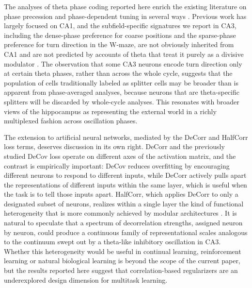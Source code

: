 \documentclass[11pt]{article}
\begin{document}
The analyses of theta phase coding reported here enrich the existing
literature on phase precession and phase-dependent tuning in several ways
\cite{okeefe1993phase,tsodyks1996population,skaggs1996theta}. Previous
work has largely focused on CA1, and the subfield-specific signatures we
report in CA3, including the dense-phase preference for coarse positions
and the sparse-phase preference for turn direction in the W-maze, are not
obviously inherited from CA1 and are not predicted by accounts of theta
that treat it purely as a divisive modulator \cite{isaacson2011inhibition}.
The observation that some CA3 neurons encode turn direction only at
certain theta phases, rather than across the whole cycle, suggests that
the population of cells traditionally labeled as splitter cells may be
broader than is apparent from phase-averaged analyses, because neurons
that are theta-specific splitters will be discarded by whole-cycle
analyses. This resonates with broader views of the hippocampus as
representing the external world in a richly multiplexed fashion across
oscillation phases.

The extension to artificial neural networks, mediated by the DeCorr and
HalfCorr loss terms, deserves discussion in its own right. DeCorr and the
previously studied DeCov loss \cite{cogswell2016reducing} operate on
different axes of the activation matrix, and the contrast is empirically
important: DeCov reduces overfitting by encouraging different neurons to
respond to different inputs, while DeCorr actively pulls apart the
representations of different inputs within the same layer, which is
useful when the task is to tell those inputs apart. HalfCorr, which
applies DeCorr to only a designated subset of neurons, realizes within a
single layer the kind of functional heterogeneity that is more commonly
achieved by modular architectures \cite{lecun2015deep}. It is natural to
speculate that a spectrum of decorrelation strengths, assigned neuron by
neuron, could produce a continuous family of representational scales
analogous to the continuum swept out by a theta-like inhibitory
oscillation in CA3. Whether this heterogeneity would be useful in
continual learning, reinforcement learning or natural biological learning
is beyond the scope of the current paper, but the results reported here
suggest that correlation-based regularizers are an underexplored design
dimension for multitask learning.
\end{document}
